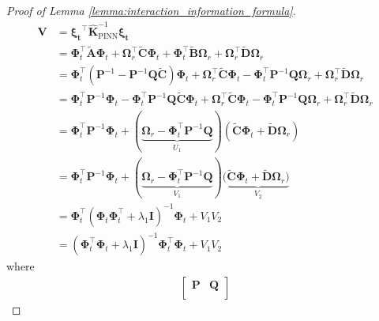 \begin{proof}[Proof of Lemma \ref{lemma:interaction_information_formula}]
    \begin{align}
            \mathbf{V} &= \boldsymbol{\boldsymbol{\xi}_t}^\top \mathbf{\widehat{K}}_\mathrm{PINN}^{-1} \boldsymbol{\boldsymbol{\xi}_t} \\
            &=\boldsymbol{\Phi}_t^\top \widetilde{\mathbf{A}}\boldsymbol{\Phi}_t + \boldsymbol{\Omega}_r^\top \widetilde{\mathbf{C}}\boldsymbol{\Phi}_t + \boldsymbol{\Phi}_t^\top \widetilde{\mathbf{B}}\boldsymbol{\Omega}_r + \boldsymbol{\Omega}_r^\top \widetilde{\mathbf{D}}\boldsymbol{\Omega}_r \\
            & = \boldsymbol{\Phi}_t^\top (\mathbf{P}^{-1} - \mathbf{P}^{-1}\mathbf{Q}\widetilde{\mathbf{C}})\boldsymbol{\Phi}_t + \boldsymbol{\Omega}_r^\top \widetilde{\mathbf{C}}\boldsymbol{\Phi}_t - \boldsymbol{\Phi}_t^\top \mathbf{P}^{-1}\mathbf{Q}\boldsymbol{\Omega}_r + \boldsymbol{\Omega}_r^\top \widetilde{\mathbf{D}}\boldsymbol{\Omega}_r \\
            & = \boldsymbol{\Phi}_t^\top \mathbf{P}^{-1}\boldsymbol{\Phi}_t - \boldsymbol{\Phi}_t^\top\mathbf{P}^{-1}\mathbf{Q}\widetilde{\mathbf{C}}\boldsymbol{\Phi}_t + \boldsymbol{\Omega}_r^\top \widetilde{\mathbf{C}}\boldsymbol{\Phi}_t - \boldsymbol{\Phi}_t^\top \mathbf{P}^{-1}\mathbf{Q}\boldsymbol{\Omega}_r + \boldsymbol{\Omega}_r^\top \widetilde{\mathbf{D}}\boldsymbol{\Omega}_r \\
            & = \boldsymbol{\Phi}_t^\top \mathbf{P}^{-1}\boldsymbol{\Phi}_t + (\underbrace{\boldsymbol{\Omega}_r - \boldsymbol{\Phi}_t^\top\mathbf{P}^{-1}\mathbf{Q}}_{U_1})(\widetilde{\mathbf{C}}\boldsymbol{\Phi}_t + \widetilde{\mathbf{D}}\boldsymbol{\Omega}_r) \\
            & = \boldsymbol{\Phi}_t^\top \mathbf{P}^{-1}\boldsymbol{\Phi}_t + (\underbrace{\boldsymbol{\Omega}_r - \boldsymbol{\Phi}_t^\top\mathbf{P}^{-1}\mathbf{Q}}_{V_1})(\underbrace{\widetilde{\mathbf{C}}\boldsymbol{\Phi}_t + \widetilde{\mathbf{D}}\boldsymbol{\Omega}_r)}_{V_2} \\
            & = \boldsymbol{\Phi}_t^\top (\boldsymbol{\Phi}_t\boldsymbol{\Phi}_t^\top+\lambda_1 \mathbf{I})^{-1} \boldsymbol{\Phi}_t + V_1V_2\\
            & = (\boldsymbol{\Phi}_t^\top\boldsymbol{\Phi}_t+\lambda_1 \mathbf{I})^{-1} \boldsymbol{\Phi}_t^\top\boldsymbol{\Phi}_t + V_1V_2
    \end{align}
    where 
    \begin{align}
            \label{terms:pqrs}
            \begin{bmatrix}
            \mathbf{P} & \mathbf{Q} \\

\end{bmatrix}
\end{align}
\end{proof}
